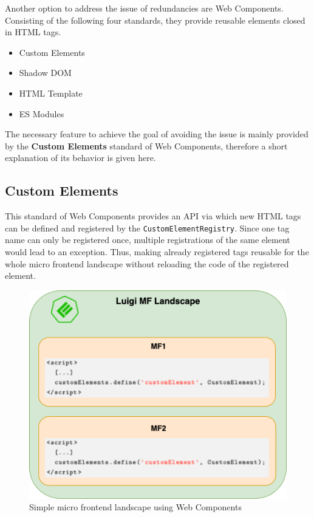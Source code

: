Another option to address the issue of redundancies are Web Components. Consisting of the following four standards, they provide reusable elements closed in HTML tags.\cite{mdn_web_docs}

\begin{itemize}[noitemsep]
	\item Custom Elements
	\item Shadow DOM
	\item HTML Template
	\item ES Modules
\end{itemize}


The necessary feature to achieve the goal of avoiding the issue is mainly provided by the \textbf{Custom Elements} standard of Web Components, therefore a short explanation of its behavior is given here.

\subsection{Custom Elements}

This standard of Web Components provides an API via which new HTML tags can be defined and registered by the \texttt{CustomElementRegistry}. Since one tag name can only be registered once, multiple registrations of the same element would lead to an exception. Thus, making already registered tags reusable for the whole micro frontend landscape without reloading the code of the registered element.\cite{google_reusable_wcs}

\begin{figure}[!h]
	\centering
	\includegraphics[width=1\textwidth]{Figures/customElements_registered.drawio.png}
	\caption{Simple micro frontend landscape using Web Components}
	\label{fig:same_wc_example}
\end{figure}

